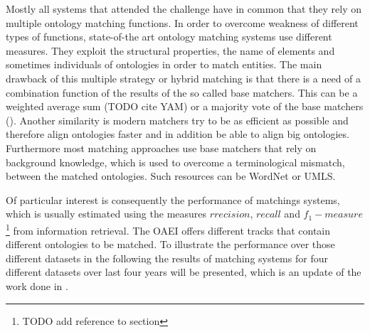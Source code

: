 \documentclass[11pt,titlepage,oneside,openany,a4paper]{report}
\begin{document}
Mostly all systems that attended the challenge have in common that  they rely on multiple ontology matching functions. In order to overcome weakness of different types of functions, state-of-the art ontology matching systems use different measures. They exploit the structural properties, the name of elements and sometimes individuals of ontologies in order to match entities. The main drawback of this multiple strategy or hybrid matching is that there is a need of a combination function of the results of the so called base matchers. This can be a weighted average sum (TODO cite YAM) or a majority vote of the base matchers (\cite{Eckert:2009:IOM:1561533.1561553}). \cite{6104044}
Another similarity is modern matchers try to be as efficient as possible and therefore align ontologies faster and in addition be able to align big ontologies.\cite{Rahm:2011aa}
Furthermore most matching approaches use base matchers that rely on background knowledge, which is used to overcome a terminological mismatch, between the matched ontologies. Such resources can be WordNet \cite{fellbaum1998wordnet} or UMLS\cite{bodenreider2004unified}. \cite{Euzenat:2011aa} 

Of particular interest is consequently the performance of matchings systems, which is usually estimated using the measures $rrecision$, $recall$ and $f_1-measure$ \footnote{TODO add reference to section} from information retrieval. The OAEI offers different tracks that contain different ontologies to be matched. To illustrate the performance over those different datasets in the following the results of matching systems for four different datasets over last four years will be presented, which is an update of the work done in \cite{6104044}.
\end{document}
